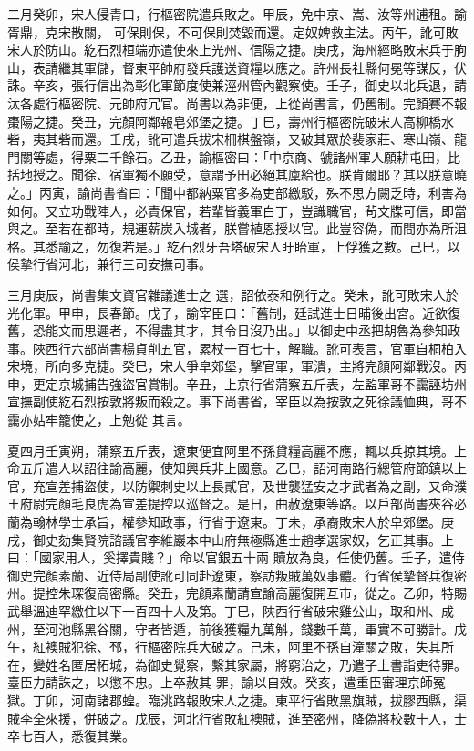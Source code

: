 \begin{pinyinscope}
 二月癸卯，宋人侵青口，行樞密院遣兵敗之。甲辰，免中京、嵩、汝等州逋租。諭胥鼎，克宋散關，
 可保則保，不可保則焚毀而還。定奴婢救主法。丙午，訛可敗宋人於防山。紇石烈桓端亦遣使來上光州、信陽之捷。庚戌，海州經略敗宋兵于朐山，表請繼其軍儲，督東平帥府發兵護送資糧以應之。許州長社縣何冕等謀反，伏誅。辛亥，張行信出為彰化軍節度使兼涇州管內觀察使。壬子，御史以北兵退，請汰各處行樞密院、元帥府冗官。尚書以為非便，上從尚書言，仍舊制。完顏賽不報棗陽之捷。癸丑，完顏阿鄰報皂郊堡之捷。丁巳，壽州行樞密院破宋人高柳橋水砦，夷其砦而還。壬戌，訛可遣兵拔宋柵棋盤嶺，又破其眾於裴家莊、寒山嶺、龍
 門關等處，得粟二千餘石。乙丑，諭樞密曰：「中京商、虢諸州軍人願耕屯田，比括地授之。聞徐、宿軍獨不願受，意謂予田必絕其廩給也。朕肯爾耶？其以朕意曉之。」丙寅，諭尚書省曰：「聞中都納粟官多為吏部繳駁，殊不思方闕乏時，利害為如何。又立功戰陣人，必責保官，若輩皆義軍白丁，豈識職官，茍文牒可信，即當與之。至若在都時，規運薪炭入城者，朕嘗植恩授以官。此豈容偽，而間亦為所沮格。其悉諭之，勿復若是。」紇石烈牙吾塔破宋人盱眙軍，上俘獲之數。己巳，以侯摯行省河北，兼行三司安撫司事。



 三月庚辰，尚書集文資官雜議進士之
 選，詔依泰和例行之。癸未，訛可敗宋人於光化軍。甲申，長春節。戊子，諭宰臣曰：「舊制，廷試進士日晡後出宮。近欲復舊，恐能文而思遲者，不得盡其才，其令日沒乃出。」以御史中丞把胡魯為參知政事。陜西行六部尚書楊貞削五官，累杖一百七十，解職。訛可表言，官軍自桐柏入宋境，所向多克捷。癸巳，宋人爭皁郊堡，擊官軍，軍潰，主將完顏阿鄰戰沒。丙申，更定京城捕告強盜官賞制。辛丑，上京行省蒲察五斤表，左監軍哥不靄誣坊州宣撫副使紇石烈按敦將叛而殺之。事下尚書省，宰臣以為按敦之死徐議恤典，哥不靄亦姑牢籠使之，上勉從
 其言。



 夏四月壬寅朔，蒲察五斤表，遼東便宜阿里不孫貸糧高麗不應，輒以兵掠其境。上命五斤遣人以詔往諭高麗，使知興兵非上國意。乙巳，詔河南路行總管府節鎮以上官，充宣差捕盜使，以防禦刺史以上長貳官，及世襲猛安之才武者為之副，又命濮王府尉完顏毛良虎為宣差提控以巡督之。是日，曲赦遼東等路。以戶部尚書夾谷必蘭為翰林學士承旨，權參知政事，行省于遼東。丁未，承裔敗宋人於皁郊堡。庚戌，御史劾集賢院諮議官李維巖本中山府無極縣進士趙孝選家奴，乞正其事。上曰：「國家用人，奚擇貴賤？」命以官銀五十兩
 贖放為良，任使仍舊。壬子，遣侍御史完顏素蘭、近侍局副使訛可同赴遼東，察訪叛賊萬奴事體。行省侯摯督兵復密州。提控朱琛復高密縣。癸丑，完顏素蘭請宣諭高麗復開互市，從之。乙卯，特賜武舉溫迪罕繳住以下一百四十人及第。丁巳，陜西行省破宋雞公山，取和州、成州，至河池縣黑谷關，守者皆遁，前後獲糧九萬斛，錢數千萬，軍實不可勝計。戊午，紅襖賊犯徐、邳，行樞密院兵大破之。己未，阿里不孫自潼關之敗，失其所在，變姓名匿居柘城，為御史覺察，繫其家屬，將窮治之，乃遣子上書詣吏待罪。臺臣力請誅之，以懲不忠。上卒赦其
 罪，諭以自效。癸亥，遣重臣審理京師冤獄。丁卯，河南諸郡蝗。臨洮路報敗宋人之捷。東平行省敗黑旗賊，拔膠西縣，渠賊李全來援，併破之。戊辰，河北行省敗紅襖賊，進至密州，降偽將校數十人，士卒七百人，悉復其業。




\end{pinyinscope}
